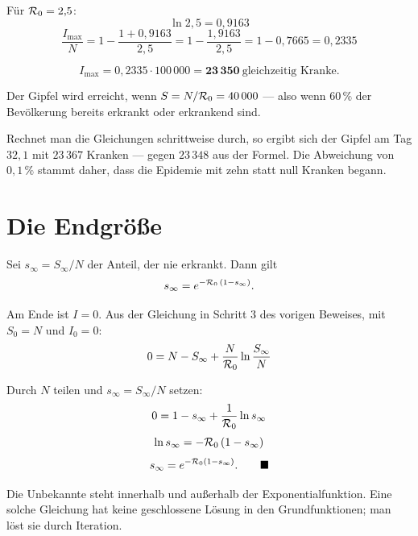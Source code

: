 \begin{merksatz}
Für $\mathcal{R}_0 = 2{,}5$:
\[ \ln 2{,}5 = 0{,}9163 \]
\[ \frac{I_{\max}}{N} = 1 - \frac{1 + 0{,}9163}{2{,}5} = 1 - \frac{1{,}9163}{2{,}5} = 1 - 0{,}7665 = 0{,}2335 \]

\[ I_{\max} = 0{,}2335 \cdot 100\,000 = \mathbf{23\,350} \ \text{gleichzeitig Kranke} . \]

Der Gipfel wird erreicht, wenn $S = N/\mathcal{R}_0 = 40\,000$ --- also wenn $60\,\%$ der Bevölkerung bereits erkrankt oder erkrankend sind.

Rechnet man die Gleichungen schrittweise durch, so ergibt sich der Gipfel am Tag $32{,}1$ mit $23\,367$ Kranken --- gegen $23\,348$ aus der Formel. Die Abweichung von $0{,}1\,\%$ stammt daher, dass die Epidemie mit zehn statt null Kranken begann. \checkmark

\begin{center}
\begin{minipage}{0.88\textwidth}
\end{minipage}
\end{center}
\end{merksatz}

\section{Die Endgröße}

\begin{merksatz}
Sei $s_\infty = S_\infty/N$ der Anteil, der nie erkrankt. Dann gilt
\[ s_\infty = e^{-\mathcal{R}_0\,(1-s_\infty)} . \]

Am Ende ist $I = 0$. Aus der Gleichung in Schritt 3 des vorigen Beweises, mit $S_0 = N$ und $I_0 = 0$:
\[ 0 = N - S_\infty + \frac{N}{\mathcal{R}_0}\ln\frac{S_\infty}{N} \]

Durch $N$ teilen und $s_\infty = S_\infty/N$ setzen:
\[ 0 = 1 - s_\infty + \frac{1}{\mathcal{R}_0}\ln s_\infty \]
\[ \ln s_\infty = -\mathcal{R}_0\,(1-s_\infty) \]
\[ s_\infty = e^{-\mathcal{R}_0(1-s_\infty)} . \qquad \blacksquare \]

Die Unbekannte steht innerhalb und außerhalb der Exponentialfunktion. Eine solche Gleichung hat keine geschlossene Lösung in den Grundfunktionen; man löst sie durch Iteration.
\end{merksatz}

